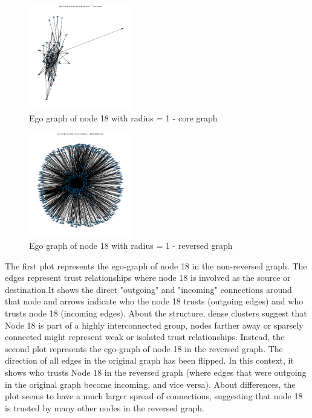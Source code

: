 \documentclass[conference]{IEEEtran}
\begin{document}
\begin{figure}[H]
    \centerline{\includegraphics[width=0.4\textwidth]{img/node18_core.png}}
    \centering
    \caption{Ego graph of node 18 with radius = 1 - core graph}
    \label{fig:ego18core}
\end{figure}

\begin{figure}[H]
    \centerline{\includegraphics[width=0.4\textwidth]{img/node18_reversed.png}}
    \centering
    \caption{Ego graph of node 18 with radius = 1 - reversed graph}
    \label{fig:ego18core}
\end{figure}

The first plot represents the ego-graph of node 18 in the non-reversed graph. The edges represent trust relationships where node 18 is involved as the source or destination.It shows the direct "outgoing" and "incoming" connections around that node and arrows indicate who the node 18 trusts (outgoing edges) and who trusts node 18 (incoming edges). About the structure, dense clusters suggest that Node 18 is part of a highly interconnected group, nodes farther away or sparsely connected might represent weak or isolated trust relationships.
Instead, the second plot represents the ego-graph of node 18 in the reversed graph. The direction of all edges in the original graph has been flipped. In this context, it shows who trusts Node 18 in the reversed graph (where edges that were outgoing in the original graph become incoming, and vice versa). About differences, the plot seems to have a much larger spread of connections, suggesting that node 18 is trusted by many other nodes in the reversed graph.
\end{document}

